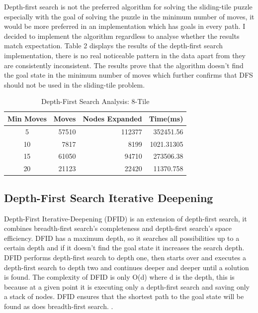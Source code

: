 \documentclass[final]{cmpreport}
\begin{document}
Depth-first search is not the preferred algorithm for solving the sliding-tile puzzle especially with the goal of solving the puzzle in the minimum number of moves, it would be more preferred in an implementation which has goals in every path. I decided to implement the algorithm regardless to analyse whether the results match expectation. Table 2 displays the results of the depth-first search implementation, there is no real noticeable pattern in the data apart from they are consistently inconsistent. The results prove that the algorithm doesn't find the goal state in the minimum number of moves which further confirms that DFS should not be used in the sliding-tile problem. 

\begin{table}[ht]
	\caption{Depth-First Search Analysis: 8-Tile}
	\begin{center}
		\begin{tabular}{crrr} \hline
			Min Moves & Moves & Nodes Expanded &Time(ms)  \\ \hline
			5  & 57510 & 112377 & 352451.56 \\
			10 & 7817 &8199&  1021.31305 \\ 
			15 & 61050 & 94710& 273506.38 \\ 
			20 & 21123& 22420 & 11370.758 \\ \hline
		\end{tabular}
	\end{center}
\end{table}

  
\subsection{Depth-First Search Iterative Deepening}
Depth-First Iterative-Deepening (DFID) is an extension of depth-first search, it combines breadth-first search's completeness and depth-first search's space efficiency. DFID has a maximum depth, so it searches all possibilities up to a certain depth and if it doesn't find the goal state it increases the search depth. DFID performs depth-first search to depth one, then starts over and executes a depth-first search to depth two and continues deeper and deeper until a solution is found. The complexity of DFID is only O(d) where d is the depth, this is because at a given point it is executing only a depth-first search and saving only a stack of nodes. DFID ensures that the shortest path to the goal state will be found as does breadth-first search. \citep{DBLP:conf/otm/MeissnerB11}.
\makeatletter
\def\BState{\State\hskip-\ALG@thistlm}
\makeatother
\end{document}
